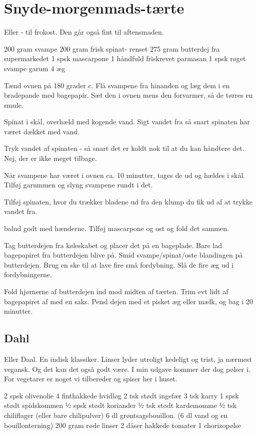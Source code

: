 \documentclass[
]{book}
\begin{document}
\chapter{Snyde-morgenmads-tærte}\label{snyde-morgenmads-tuxe6rte}

Eller - til frokost. Den går også fint til aftensmaden.

200 gram svampe
200 gram frisk spinat- renset
275 gram butterdej fra supermarkedet
1 spsk mascarpone
1 håndfuld friskrevet parmasan
1 spsk røget svampe garum
4 æg

Tænd ovnen på 180 grader c.
Flå svampene fra hinanden og læg dem i en bradepande med
bagepapir. Sæt den i ovnen mens den forvarmer, så de
tørres en smule.

Spinat i skål, overhæld med kogende vand. Sigt vandet fra så
snart spinaten har været dækket med vand.

Tryk vandet af spinaten - så snart det er koldt nok til at
du kan håndtere det. Nej, der er ikke meget tilbage.

Når svampene har været i ovnen ca. 10 minutter, tages de ud
og hældes i skål. Tilføj garummen og slyng svampene rundt i det.

Tilføj spinaten, hvor du trækker bladene ud fra den klump du
fik ud af at trykke vandet fra.

balnd godt med hænderne. Tilføj mascarpone og ost og fold det
sammen.

Tag butterdejen fra køleskabet og placer det på en bageplade.
Bare lad bagepapiret fra butterdejen blive på.
Smid svampe/spinat/oste blandingen på butterdejen. Brug en
ske til at lave fire små fordybning. Slå de fire æg ud i
fordybningerne.

Fold hjørnerne af butterdejen ind mod midten af tærten. Trim
evt lidt af bagepapiret af med en saks. Pensl dejen
med et pisket æg eller mælk, og bag i 20 minutter.

\section{Dahl}\label{dahl-1}

Eller Daal. En indisk klassiker. Linser lyder utroligt kedeligt og trist, ja nærmest vegansk. Og det kan det også godt være. I min udgave kommer der dog pølser i. For vegetarer er noget vi tilbereder og spiser her i huset.

2 spsk olivenolie
4 finthakkede hvidløg
2 tsk stødt ingefær
3 tsk karry
1 spsk stødt spidskommen
½ spsk stødt koriander
½ tsk stødt kardemomme
½ tsk chiliflager (eller bare chilipulver)
6 dl grøntsagsbouillon. (6 dl vand og en bouillonterning)
200 gram røde linser
2 dåser hakkede tomater
1 chorizopølse
\end{document}
